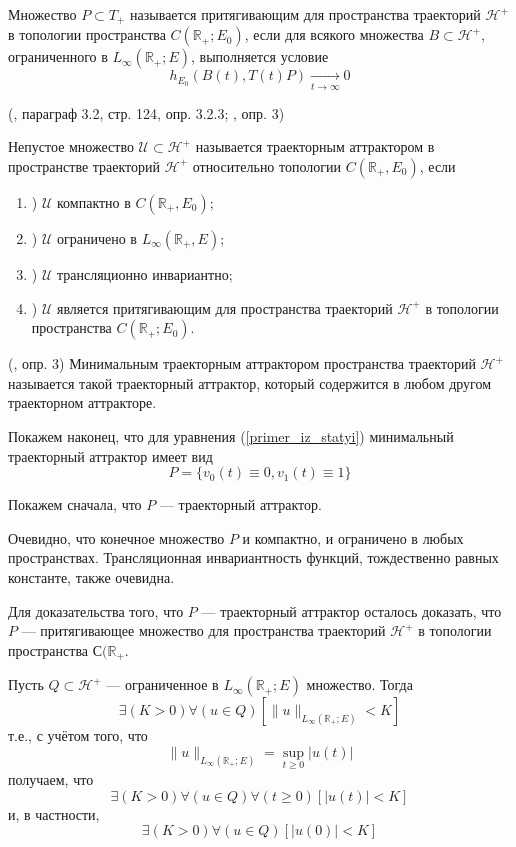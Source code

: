 Множество $P \subset T_+$ называется притягивающим для пространства траекторий $\mathcal{H}^+$ в топологии пространства $C(\mathbb{R}_+; E_0)$,
если для всякого множества $B \subset \mathcal{H}^+$, ограниченного в $L_{\infty}(\mathbb{R}_+;E)$, выполняется условие
\begin{equation}
	h_{E_0}(B(t),T(t)P) \xrightarrow[t\to\infty]{}0
\end{equation}


\opred (\cite{Zelenaya}, параграф 3.2, стр. 124, опр. 3.2.3; \cite{zhidkosti_s_pamyatyu}, опр. 3)

Непустое множество $\mathcal{U}\subset\mathcal{H}^+$ называется траекторным аттрактором в пространстве траекторий $\mathcal{H}^+$ относительно топологии $C(\mathbb{R}_+,E_0)$, если
\begin{enumerate}
	\item)
		$\mathcal{U}$ компактно в $C(\mathbb{R}_+,E_0)$;
	\item)
		$\mathcal{U}$ ограничено в $L_{\infty}(\mathbb{R}_+,E)$;
	\item)
		$\mathcal{U}$ трансляционно инвариантно;
	\item)
		$\mathcal{U}$ является притягивающим для пространства траекторий $\mathcal{H}^+$ в топологии пространства $C(\mathbb{R}_+; E_0)$.
\end{enumerate}

\opred (\cite{zhidkosti_s_pamyatyu}, опр. 3)
Минимальным траекторным аттрактором пространства траекторий $\mathcal{H}^+$ называется такой траекторный аттрактор, который содержится в любом другом траекторном аттракторе.


Покажем наконец, что для уравнения (\ref{primer_iz_statyi}) минимальный траекторный аттрактор имеет вид
\begin{equation}
	P = \{ v_0(t) \equiv 0, v_1(t) \equiv 1\}
\end{equation}

Покажем сначала, что $P$ --- траекторный аттрактор.

Очевидно, что конечное множество $P$ и компактно, и ограничено в любых пространствах.
Трансляционная инвариантность функций, тождественно равных константе, также очевидна.

Для доказательства того, что $P$ --- траекторный аттрактор осталось доказать, что $P$ --- притягивающее множество для пространства траекторий $\mathcal{H}^+$ в топологии пространства $С(\mathbb{R}_+$.

Пусть $Q \subset \mathcal{H}^+$ --- ограниченное в $L_{\infty}(\mathbb{R}_+;E)$ множество.
Тогда
\begin{equation}
	\exists(K>0)\forall(u\in Q)\left[ \| u \|_{L_{\infty}(\mathbb{R}_+;E)} < K\right]
\end{equation}
т.е., с учётом того, что
$$
	\| u \|_{L_{\infty}(\mathbb{R}_+;E)} = \sup_{t\geq 0}|u(t)|
$$
получаем, что
\begin{equation}
	\exists(K>0)\forall(u\in Q)\forall(t \geq 0)\left[ | u (t) | < K\right]
\end{equation}
и, в частности,
\begin{equation}
	\exists(K>0)\forall(u\in Q)\left[ | u (0) | < K\right]
\end{equation}


